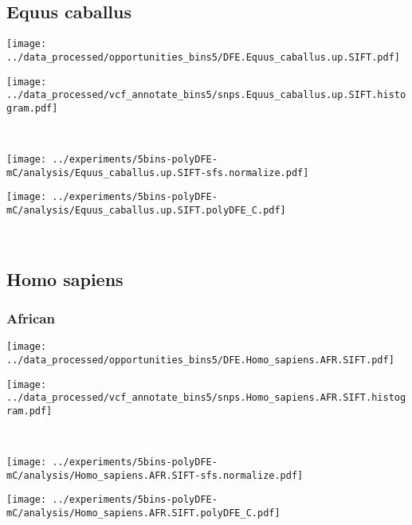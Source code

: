 \subsection{Equus caballus}

\begin{minipage}{0.49\linewidth}
    \texttt{[image: ../data\_processed/opportunities\_bins5/DFE.Equus\_caballus.up.SIFT.pdf]}
\end{minipage}
\begin{minipage}{0.49\linewidth}
    \texttt{[image: ../data\_processed/vcf\_annotate\_bins5/snps.Equus\_caballus.up.SIFT.histogram.pdf]}
\end{minipage}
\\
\begin{minipage}{0.49\linewidth}
    \texttt{[image: ../experiments/5bins-polyDFE-mC/analysis/Equus\_caballus.up.SIFT-sfs.normalize.pdf]}
\end{minipage}
\begin{minipage}{0.49\linewidth}
    \texttt{[image: ../experiments/5bins-polyDFE-mC/analysis/Equus\_caballus.up.SIFT.polyDFE\_C.pdf]}
\end{minipage}
\\

\subsection{Homo sapiens}

\subsubsection{African}

\begin{minipage}{0.49\linewidth}
    \texttt{[image: ../data\_processed/opportunities\_bins5/DFE.Homo\_sapiens.AFR.SIFT.pdf]}
\end{minipage}
\begin{minipage}{0.49\linewidth}
    \texttt{[image: ../data\_processed/vcf\_annotate\_bins5/snps.Homo\_sapiens.AFR.SIFT.histogram.pdf]}
\end{minipage}
\\
\begin{minipage}{0.49\linewidth}
    \texttt{[image: ../experiments/5bins-polyDFE-mC/analysis/Homo\_sapiens.AFR.SIFT-sfs.normalize.pdf]}
\end{minipage}
\begin{minipage}{0.49\linewidth}
    \texttt{[image: ../experiments/5bins-polyDFE-mC/analysis/Homo\_sapiens.AFR.SIFT.polyDFE\_C.pdf]}
\end{minipage}
\\

